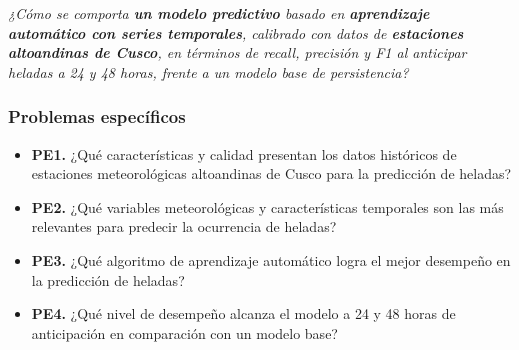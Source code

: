\textit{¿Cómo se comporta \textcolor{colProceso}{\textbf{un modelo predictivo}} basado en \textcolor{colTecnologia}{\textbf{aprendizaje automático con series temporales}}, calibrado con datos de \textcolor{colContexto}{\textbf{estaciones altoandinas de Cusco}}, en términos de recall, precisión y F1 al anticipar heladas a 24 y 48 horas, frente a un modelo base de persistencia?}
\subsubsection{Problemas específicos}

\begin{itemize}
  \item \textbf{PE1.} ¿Qué características y calidad presentan los datos históricos de estaciones meteorológicas altoandinas de Cusco para la predicción de heladas?
  \item \textbf{PE2.} ¿Qué variables meteorológicas y características temporales son las más relevantes para predecir la ocurrencia de heladas?
  \item \textbf{PE3.} ¿Qué algoritmo de aprendizaje automático logra el mejor desempeño en la predicción de heladas?
  \item \textbf{PE4.} ¿Qué nivel de desempeño alcanza el modelo a 24 y 48 horas de anticipación en comparación con un modelo base?
\end{itemize}